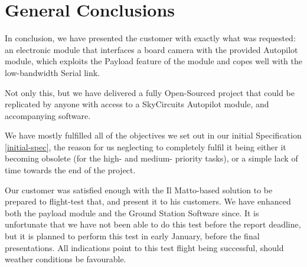 \section{General Conclusions}

In conclusion, we have presented the customer with exactly what was requested: 
an electronic module that interfaces a board camera with the provided Autopilot 
module, which exploits the Payload feature of the module and copes well with 
the low-bandwidth Serial link.

Not only this, but we have delivered a fully Open-Sourced project that could 
be replicated by anyone with access to a SkyCircuits Autopilot module, and 
accompanying software.

We have mostly fulfilled all of the objectives we set out in our initial 
Specification \ref{initial-spec}, the reason for us neglecting to completely 
fulfil it being either it becoming obsolete (for the high- and medium- 
priority tasks), or a simple lack of time towards the end of the project.

Our customer was satisfied enough with the Il Matto-based solution to be prepared 
to flight-test that, and present it to his customers. We have enhanced 
both the payload module and the Ground Station Software since. 
It is unfortunate that we have not been able to do this 
test before the report deadline, but it is planned to perform this test in 
early January, before the final presentations. All indications point to this 
test flight being successful, should weather conditions be favourable.
